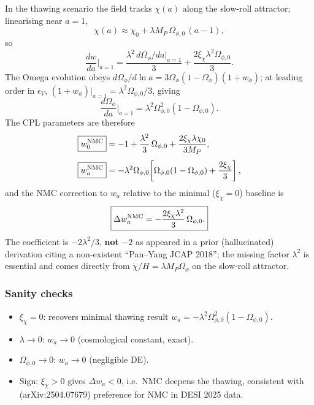 In the thawing scenario the field tracks $\chi(a)$ along the slow-roll
attractor; linearising near $a=1$,
\begin{equation}
    \chi(a) \approx \chi_0 + \lambda M_P\,\Omega_{\phi,0}\,(a-1),
    \label{eq:chi-tracker}
\end{equation}
so
\begin{equation}
    \frac{dw}{da}\bigg|_{a=1} = \frac{\lambda^2\,d\Omega_\phi/da|_{a=1}}{3}
        + \frac{2\xi_\chi\lambda^2\Omega_{\phi,0}}{3}.
\end{equation}
The Omega evolution obeys $d\Omega_\phi/d\!\ln a = 3\Omega_\phi(1-\Omega_\phi)(1+w_\phi)$;
at leading order in $\epsilon_V$,
$(1+w_\phi)|_{a=1}=\lambda^2\Omega_{\phi,0}/3$, giving
\begin{equation}
    \frac{d\Omega_\phi}{da}\bigg|_{a=1}
        = \lambda^2\Omega_{\phi,0}^2(1-\Omega_{\phi,0}).
\end{equation}
The CPL parameters are therefore
\begin{align}
    \boxed{w_0^{\rm NMC}} &= -1 + \frac{\lambda^2}{3}\,\Omega_{\phi,0}
        + \frac{2\xi_\chi\lambda\chi_0}{3M_P}, \label{eq:w0-NMC}\\[4pt]
    \boxed{w_a^{\rm NMC}} &= -\lambda^2\Omega_{\phi,0}\!\left[
        \Omega_{\phi,0}(1-\Omega_{\phi,0}) + \frac{2\xi_\chi}{3}
        \right], \label{eq:wa-NMC}
\end{align}
and the NMC correction to $w_a$ relative to the minimal ($\xi_\chi=0$) baseline is
\begin{equation}
    \boxed{\Delta w_a^{\rm NMC} = -\frac{2\xi_\chi\lambda^2}{3}\,\Omega_{\phi,0}.}
    \label{eq:Dwa-NMC}
\end{equation}
The coefficient is $-2\lambda^2/3$, \textbf{not} $-2$ as appeared in a
prior (hallucinated) derivation citing a non-existent ``Pan--Yang JCAP 2018'';
the missing factor $\lambda^2$ is essential and comes directly from
$\dot\chi/H = \lambda M_P\Omega_\phi$ on the slow-roll attractor.

\subsubsection*{Sanity checks}
\begin{itemize}
    \item $\xi_\chi=0$: recovers minimal thawing result $w_a=-\lambda^2\Omega_{\phi,0}^2(1-\Omega_{\phi,0})$.
    \item $\lambda\to 0$: $w_a\to 0$ (cosmological constant, exact).
    \item $\Omega_{\phi,0}\to 0$: $w_a\to 0$ (negligible DE).
    \item Sign: $\xi_\chi>0$ gives $\Delta w_a<0$, i.e.\ NMC deepens the thawing,
          consistent with \citet{Wolf:2025} (arXiv:2504.07679) preference for
          NMC in DESI 2025 data.
\end{itemize}

